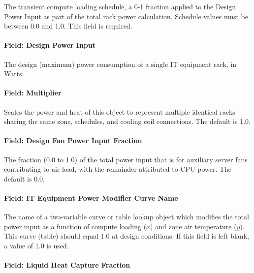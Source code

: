 The transient compute loading schedule, a 0-1 fraction applied to the Design Power Input as part of the total rack power calculation. Schedule values must be between 0.0 and 1.0. This field is required.

\paragraph{Field: Design Power Input}\label{field-design-power-input-iteliquidcooled}

The design (maximum) power consumption of a single IT equipment rack, in Watts.

\paragraph{Field: Multiplier}\label{field-multiplier-iteliquidcooled}

Scales the power and heat of this object to represent multiple identical racks sharing the same zone, schedules, and cooling coil connections. The default is 1.0.

\paragraph{Field: Design Fan Power Input Fraction}\label{field-design-fan-power-input-fraction-iteliquidcooled}

The fraction (0.0 to 1.0) of the total power input that is for auxiliary server fans contributing to air load, with the remainder attributed to CPU power. The default is 0.0.

\paragraph{Field: IT Equipment Power Modifier Curve Name}\label{field-it-equipment-power-modifier-curve-name-iteliquidcooled}

The name of a two-variable curve or table lookup object which modifies the total power input as a function of compute loading ($x$) and zone air temperature ($y$). This curve (table) should equal 1.0 at design conditions. If this field is left blank, a value of 1.0 is used.

\paragraph{Field: Liquid Heat Capture Fraction}\label{field-liquid-heat-capture-fraction-iteliquidcooled}

